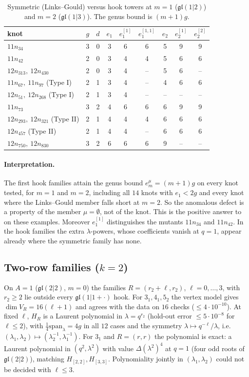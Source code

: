 \documentclass[11pt]{article}
\theoremstyle{definition}
\theoremstyle{remark}
\newcommand{\gl}{\mathfrak{gl}}
\begin{document}
\begin{table}[h]
\centering
\begin{tabular}{lcc|ccc|ccc}
\toprule
knot & $g$ & $d$ & $e_1$ & $e^{[1]}_1$ & $e^{[1,1]}_1$ & $e_2$ & $e^{[1]}_2$ & $e^{[2]}_2$\\
\midrule
$11n_{34}$ & 3 & 0 & 3 & 6 & 6 & 5 & 9 & 9\\
$11n_{42}$ & 2 & 0 & 3 & 4 & 4 & 5 & 6 & 6\\
$12n_{313},\ 12n_{430}$ & 2 & 0 & 3 & 4 & -- & 5 & 6 & --\\
$11n_{67},\ 11n_{97}$ (Type I) & 2 & 1 & 3 & 4 & -- & 4 & 6 & 6\\
$12n_{51},\ 12n_{268}$ (Type I) & 2 & 1 & 3 & 4 & -- & -- & -- & --\\
$11n_{73}$ & 3 & 2 & 4 & 6 & 6 & 6 & 9 & 9\\
$12n_{293},\ 12n_{321}$ (Type II) & 2 & 1 & 4 & 4 & 4 & 6 & 6 & 6\\
$12n_{457}$ (Type II) & 2 & 1 & 4 & 4 & -- & 6 & 6 & 6\\
$12n_{750},\ 12n_{830}$ & 3 & 2 & 6 & 6 & 6 & 9 & -- & --\\
\bottomrule
\end{tabular}
\caption{Symmetric (Links--Gould) versus hook towers at $m=1$ ($\gl(1|2)$) and $m=2$ ($\gl(1|3)$).  The genus bound is $(m+1)g$.}\label{tab:hooks}
\end{table}

\paragraph{Interpretation.}  The first hook families attain the genus bound $e^\mu_m=(m+1)g$ on every knot
tested, for $m=1$ and $m=2$, including all $14$ knots with $e_1<2g$ and every knot where the Links--Gould member
falls short at $m=2$.  So the anomalous defect is a property of the member
$\mu=\emptyset$, not of the knot.  This is the positive answer to \cite[Question~1.4]{LNG} on these examples.
Moreover $e^{[1]}_1$ distinguishes the mutants $11n_{34}$ and $11n_{42}$.  In the hook families the extra
$\lambda$-powers, whose coefficients vanish at $q=1$, appear already where the symmetric family has none.


\subsection{Two-row families ($k=2$)}
On $A=1$ ($\gl(2|2)$, $m=0$) the families $R=(r_2+\ell,r_2)$, $\ell=0,\dots,3$, with $r_2\ge2$ lie outside every
$\gl(1|1+\cdot)$ hook.  For $3_1,4_1,5_2$ the vertex model gives $\dim V_R=16(\ell+1)$ and agrees with the data on
$16$ checks ($\le4\cdot10^{-10}$).  At fixed $\ell$, $H_R$ is a Laurent polynomial in $\lambda=q^{r_2}$ (hold-out
error $\le5\cdot10^{-8}$ for $\ell\le2$), with $\frac14\mathrm{span}_\lambda=4g$ in all $12$ cases and the symmetry
$\lambda\mapsto q^{-\ell}/\lambda$, i.e.\ $(\lambda_1,\lambda_2)\mapsto(\lambda_2^{-1},\lambda_1^{-1})$.  For $3_1$ and
$R=(r,r)$ the polynomial is exact: a Laurent polynomial in $(q^2,\lambda^2)$ with value $\Delta(\lambda^2)^4$ at
$q=1$ (four odd roots of $\gl(2|2)$), matching $H_{[2,2]},H_{[3,3]}$.  Polynomiality jointly in $(\lambda_1,\lambda_2)$
could not be decided with $\ell\le3$.
\end{document}
